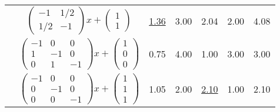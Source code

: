 \documentclass{article}
\begin{document}
\begin{landscape}
\begin{table}[htbp]
\begin{tabular}{@{} ccccccr @{}}
           & $\left( \begin{matrix} -1 & 1/2 \\ 1/2 & -1  \end{matrix} \right) x + \left( \begin{matrix} 1 \\ 1 \end{matrix} \right)$ & \underline{1.36} & 3.00 & 2.04 & 2.00 & 4.08 \\
           & $\left( \begin{matrix} -1 & 0 & 0 \\ 1 & -1 & 0 \\ 0 & 1 & -1 \end{matrix} \right) x + \left( \begin{matrix} 1 \\ 0 \\ 0 \end{matrix} \right)$ & 0.75 & 4.00 & 1.00 & 3.00 & 3.00 \\
           & $\left( \begin{matrix} -1 & 0 & 0 \\ 0 & -1 & 0 \\ 0 & 0 & -1 \end{matrix} \right) x + \left( \begin{matrix} 1 \\ 1 \\ 1 \end{matrix} \right)$ & 1.05 & 2.00 & \underline{2.10} & 1.00 & 2.10 \\
      \bottomrule
   \end{tabular}
   \label{tab:entropy_table}
\end{table}

\end{landscape}
\end{document}
